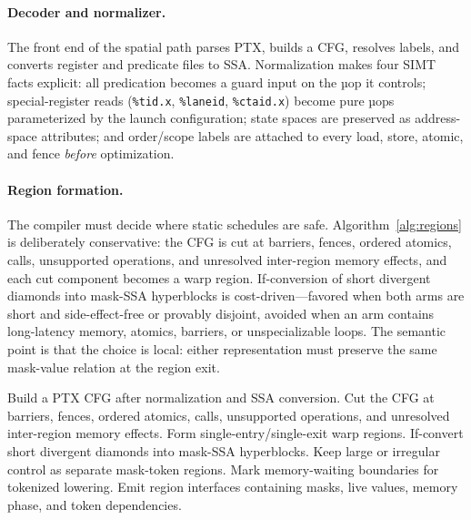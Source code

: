 \documentclass[sigplan,nonacm]{acmart}
\begin{document}
\paragraph{Decoder and normalizer.} The front end of the spatial path parses
PTX, builds a CFG, resolves labels, and converts register and predicate
files to SSA.  Normalization makes four SIMT facts explicit: all predication
becomes a guard input on the µop it controls; special-register reads
(\texttt{\%tid.x}, \texttt{\%laneid}, \texttt{\%ctaid.x}) become pure µops
parameterized by the launch configuration; state spaces are preserved as
address-space attributes; and order/scope labels are attached to every load,
store, atomic, and fence \emph{before} optimization.

\paragraph{Region formation.} The compiler must decide where static
schedules are safe.  Algorithm~\ref{alg:regions} is deliberately
conservative: the CFG is cut at barriers, fences, ordered atomics, calls,
unsupported operations, and unresolved inter-region memory effects, and each
cut component becomes a warp region.  If-conversion of short divergent
diamonds into mask-SSA hyperblocks is cost-driven---favored when both arms
are short and side-effect-free or provably disjoint, avoided when an arm
contains long-latency memory, atomics, barriers, or unspecializable loops.
The semantic point is that the choice is local: either representation must
preserve the same mask-value relation at the region exit.

\begin{algorithm}[t]
\caption{Region formation in the spatial path.}
\label{alg:regions}
\begin{algorithmic}[1]
\STATE Build a PTX CFG after normalization and SSA conversion.
\STATE Cut the CFG at barriers, fences, ordered atomics, calls,
unsupported operations, and unresolved inter-region memory effects.
  \STATE Form single-entry/single-exit warp regions.
  \STATE If-convert short divergent diamonds into mask-SSA hyperblocks.
  \STATE Keep large or irregular control as separate mask-token regions.
  \STATE Mark memory-waiting boundaries for tokenized lowering.
\ENDFOR
\STATE Emit region interfaces containing masks, live values, memory
phase, and token dependencies.
\end{algorithmic}
\end{algorithm}
\end{document}
